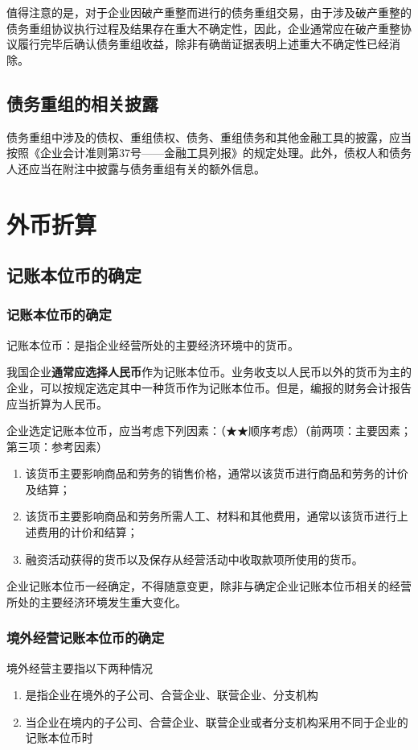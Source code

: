 \documentclass[UTF8,12pt]{ctexart}
\numberwithin{equation}{section} %
\numberwithin{figure}{section}
\numberwithin{table}{section}
\begin{document}
	值得注意的是，对于企业因破产重整而进行的债务重组交易，由于涉及破产重整的债务重组协议执行过程及结果存在重大不确定性，因此，企业通常应在破产重整协议履行完毕后确认债务重组收益，除非有确凿证据表明上述重大不确定性已经消除。
	
	\subsection{债务重组的相关披露}
	债务重组中涉及的债权、重组债权、债务、重组债务和其他金融工具的披露，应当按照《企业会计准则第37号——金融工具列报》的规定处理。此外，债权人和债务人还应当在附注中披露与债务重组有关的额外信息。
	
	\newpage
	\section{外币折算}
	\subsection{记账本位币的确定}
	\subsubsection{记账本位币的确定}
	记账本位币：是指企业经营所处的主要经济环境中的货币。
	
	我国企业\textbf{通常应选择人民币}作为记账本位币。业务收支以人民币以外的货币为主的企业，可以按规定选定其中一种货币作为记账本位币。但是，编报的财务会计报告应当折算为人民币。
	
	企业选定记账本位币，应当考虑下列因素：（★★顺序考虑）（前两项：主要因素；第三项：参考因素）
	\begin{enumerate}
		\item 该货币主要影响商品和劳务的销售价格，通常以该货币进行商品和劳务的计价及结算；
		
		\item 该货币主要影响商品和劳务所需人工、材料和其他费用，通常以该货币进行上述费用的计价和结算；
		
		\item 融资活动获得的货币以及保存从经营活动中收取款项所使用的货币。
	\end{enumerate}
	
	企业记账本位币一经确定，不得随意变更，除非与确定企业记账本位币相关的经营所处的主要经济环境发生重大变化。
	
	\subsubsection{境外经营记账本位币的确定}
	境外经营主要指以下两种情况
	\begin{enumerate}
		\item 是指企业在境外的子公司、合营企业、联营企业、分支机构
		
		\item 当企业在境内的子公司、合营企业、联营企业或者分支机构采用不同于企业的记账本位币时
	\end{enumerate}
	
\end{document}
